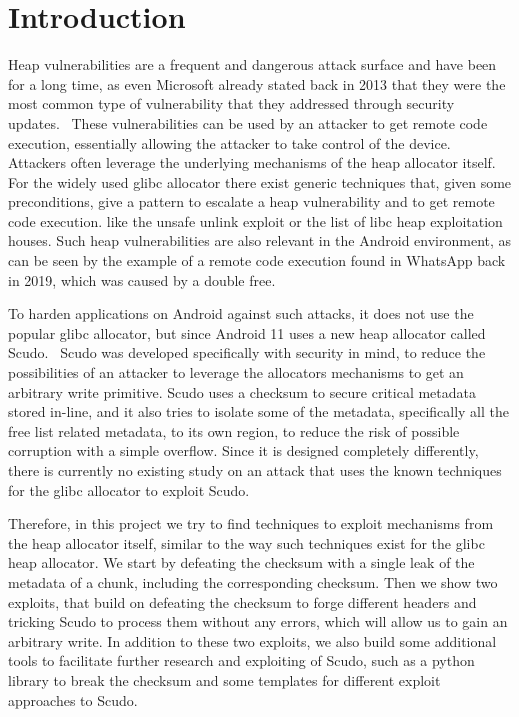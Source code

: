 \documentclass[a4paper,11pt,oneside]{report}
\begin{document}
\maketoc{}

\chapter{Introduction}

Heap vulnerabilities are a frequent and dangerous attack surface and have been for a long
time, as even Microsoft already stated back in 2013 that they were the most common type of
vulnerability that they addressed through security updates.~\cite{microsoftHeapReport}
These vulnerabilities can be used by an attacker to get remote code execution, essentially allowing
the attacker to take control of the device.
Attackers often leverage the underlying mechanisms of the heap allocator itself.
For the widely used glibc allocator there exist
generic techniques that, given some preconditions, give a pattern to escalate a heap
vulnerability and to get remote code execution. 
like the unsafe unlink exploit or
the list of libc heap exploitation houses. Such heap vulnerabilities are also relevant in
the Android environment, as can be seen by the example of a remote code execution found in
WhatsApp back in 2019, which was caused by a double free.~\cite{whatsappRCE}

To harden applications on Android against such attacks, it does not use the popular glibc
allocator, but since Android 11 uses a new heap allocator called Scudo.~\cite{llvmScudo}
Scudo was developed specifically with security in mind, to reduce the possibilities of an
attacker to leverage the allocators mechanisms to get an arbitrary write primitive. Scudo
uses a checksum to secure critical metadata stored in-line, and it also tries to isolate
some of the metadata, specifically all the free list related metadata, to its own region,
to reduce the risk of possible corruption with a simple overflow. Since it is designed
completely differently, there is currently no existing study on an attack that uses the
known techniques for the glibc allocator to exploit Scudo.

Therefore, in this project we try to find techniques to exploit mechanisms from the heap
allocator itself, similar to the way such techniques exist for the glibc heap
allocator. We start by defeating the checksum with a single leak of the metadata of a
chunk, including the corresponding checksum. Then we show two exploits, that build on
defeating the checksum to forge different headers and tricking Scudo to process them
without any errors, which will allow us to gain an arbitrary write. In addition to these
two exploits, we also build some additional tools to facilitate further research and
exploiting of Scudo, such as a python library to break the checksum and some templates for
different exploit approaches to Scudo.
\end{document}
